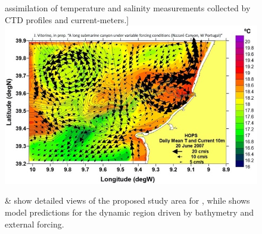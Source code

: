 \begin{figure}[!h]
  assimilation of temperature and salinity measurements collected by
  CTD profiles and
  current-meters.]{\label{fig:model}\includegraphics[scale=0.50]{fig/model.jpeg}}
  \caption{ \&  show detailed
    views of the proposed study area for \proje, while
     shows model predictions for the dynamic region
    driven by bathymetry and external forcing.}
  \label{fig:studyarea-1}
\end{figure}

